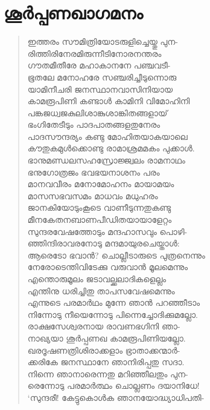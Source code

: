 \section{ശൂര്‍പ്പണഖാഗമനം}

\begin{verse}
ഇത്തരം സൗമിത്രിയോടരുളിച്ചെയ്തു പുന-\\
രിത്തിരിനേരമിരുന്നീടിനോരനന്തരം\\
ഗൗതമീതീരേ മഹാകാനനേ പഞ്ചവടീ-\\
ഭൂതലേ മനോഹരേ സഞ്ചരിച്ചീടുന്നൊരു\\
യാമിനീചരി ജനസ്ഥാനവാസിനിയായ\\
കാമരൂപിണി കണ്ടാള്‍ കാമിനി വിമോഹിനി\\
പങ്കജധ്വജകുലിശാങ്കുശാങ്കിതങ്ങളായ്\\
ഭംഗിതേടീടും പാദപാതങ്ങളതുനേരം\\
പാദസൗന്ദര്യം കണ്ടു മോഹിതയാകയാലെ\\
കൗതുകമുള്‍ക്കൊണ്ടു രാമാശ്രമമകം പുക്കാള്‍.\\
ഭാനുമണ്ഡലസഹസ്രോജ്ജ്വലം രാമനാഥം\\
ഭനുഗോത്രജം ഭവഭയനാശനം പരം\\
മാനവവീരം മനോമോഹനം മായാമയം\\
മാസസഭവസമം മാധവം മധുഹരം\\
ജാനകിയോടുംകൂടെ വാണീടുന്നതുകണ്ടു\\
മീനകേതനബാണപീഡിതയായാളേറ്റം\\
സുന്ദരവേഷത്തോടും മന്ദഹാസവും പൊഴി-\\
ഞ്ഞിന്ദിരാവരനോടു മന്ദമായുരചെയ്താള്‍:\\
ആരെടോ ഭവാന്‍? ചൊല്ലീടാരുടെ പുത്രനെന്നും\\
നേരോടെന്തിവിടേക്കു വരുവാന്‍ മൂലമെന്നും\\
എന്തൊരുമൂലം ജടാവല്ക്കലാദികളെല്ലം\\
എന്തിനു ധരിച്ചിതു താപസവേഷമെന്നും\\
എന്നുടെ പരമാര്‍ഥം മുന്നേ ഞാന്‍ പറഞ്ഞീടാം\\
നിന്നോടു നീയെന്നോടു പിന്നെച്ചോദിക്കുമല്ലോ.\\
രാക്ഷസേശ്വരനായ രാവണഭഗിനി ഞാ-\\
നാഖ്യയാ ശൂര്‍പ്പണഖ കാമരൂപിണിയല്ലോ.\\
ഖരദൂഷണത്രിശിരാക്കളാം ഭ്രാതാക്കന്മാര്‍-\\
ക്കരികേ ജനസ്ഥാനേ ഞാനിരിപ്പതു സദാ.\\
നിന്നെ ഞാനാരെന്നതു മറിഞ്ഞീലതും പുന-\\
രെന്നോടു പരമാര്‍ത്ഥം ചൊല്ലണം ദയാനിധേ!\\
‘സുന്ദരീ! കേട്ടുകൊള്‍ക ഞാനയോദ്ധ്യാധിപതി-\\

\end{verse}
